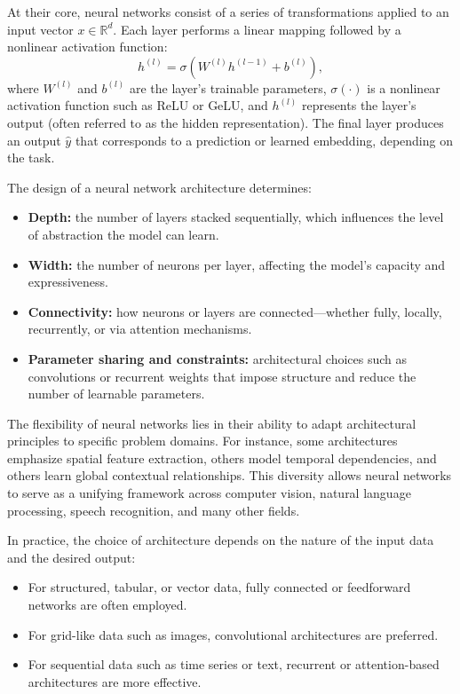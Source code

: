 \documentclass[12pt,a4paper]{report}
\begin{document}
\vspace{0.5em}
At their core, neural networks consist of a series of transformations applied to an input vector $x \in \mathbb{R}^d$. 
Each layer performs a linear mapping followed by a nonlinear activation function:
\[
h^{(l)} = \sigma(W^{(l)} h^{(l-1)} + b^{(l)}),
\]
where $W^{(l)}$ and $b^{(l)}$ are the layer’s trainable parameters, $\sigma(\cdot)$ is a nonlinear activation function such as ReLU or GeLU, and $h^{(l)}$ represents the layer’s output (often referred to as the hidden representation). 
The final layer produces an output $\hat{y}$ that corresponds to a prediction or learned embedding, depending on the task.

\vspace{0.5em}
The design of a neural network architecture determines:
\begin{itemize}
    \item \textbf{Depth:} the number of layers stacked sequentially, which influences the level of abstraction the model can learn.
    \item \textbf{Width:} the number of neurons per layer, affecting the model’s capacity and expressiveness.
    \item \textbf{Connectivity:} how neurons or layers are connected—whether fully, locally, recurrently, or via attention mechanisms.
    \item \textbf{Parameter sharing and constraints:} architectural choices such as convolutions or recurrent weights that impose structure and reduce the number of learnable parameters.
\end{itemize}

\vspace{0.5em}
The flexibility of neural networks lies in their ability to adapt architectural principles to specific problem domains. 
For instance, some architectures emphasize spatial feature extraction, others model temporal dependencies, and others learn global contextual relationships. 
This diversity allows neural networks to serve as a unifying framework across computer vision, natural language processing, speech recognition, and many other fields.

\vspace{0.5em}
In practice, the choice of architecture depends on the nature of the input data and the desired output:
\begin{itemize}
    \item For structured, tabular, or vector data, fully connected or feedforward networks are often employed.
    \item For grid-like data such as images, convolutional architectures are preferred.
    \item For sequential data such as time series or text, recurrent or attention-based architectures are more effective.
\end{itemize}
\end{document}
